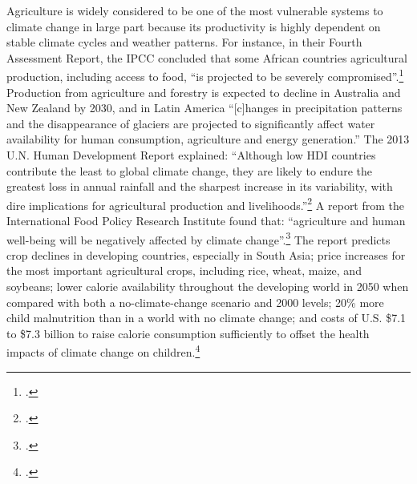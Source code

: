 Agriculture is widely considered to be one of the most vulnerable systems to climate change in large part because its productivity is highly dependent on stable climate cycles and weather patterns.
For instance, in their Fourth Assessment Report, the IPCC concluded that some African countries agricultural production, including access to food, ``is projected to be severely compromised''.\footcite[][See: Synthesis report, Table SPM.2. Examples of some projected regional impacts. \url{https://www.ipcc.ch/publications_and_data/ar4/syr/en/spms3.html}]{IPCC2007}
Production from agriculture and forestry is expected to decline in Australia and New Zealand by 2030, and in Latin America ``[c]hanges in precipitation patterns and the disappearance of glaciers are projected to significantly affect water availability for human consumption, agriculture and energy generation.''
The 2013 U.N. Human Development Report explained: ``Although low HDI countries contribute the least to global climate change, they are likely to endure the greatest loss in annual rainfall and the sharpest increase in its variability, with dire implications for agricultural production and livelihoods.''\footcite[][p. 6]{UNHumanDev2013}
A report from the International Food Policy Research Institute found that: ``agriculture and human well-being will 
be negatively affected by climate change''.\footcite[][p. vii]{IFPRIAgri}
The report predicts crop declines in developing countries, especially in South Asia; price increases for the most important agricultural crops, including rice, wheat, maize, and soybeans; lower calorie availability throughout the developing world in 2050 when compared with both a no-climate-change scenario and 2000 levels; 20\% more child malnutrition than in a world with no climate change; and costs of U.S. \$7.1 to \$7.3 billion to raise calorie consumption sufficiently to offset the health impacts of climate change on children.\footcite[][p. vii]{IFPRIAgri}



